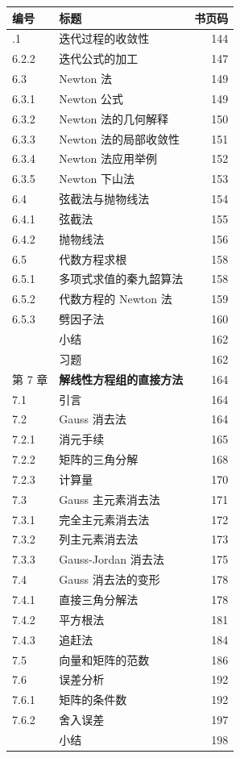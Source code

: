 {\def\LTcaptype{none} %
\begin{longtable}[]{@{}llr@{}}
\toprule\noalign{}
编号 & 标题 & 书页码 \\
\midrule\noalign{}
\endhead
\bottomrule\noalign{}
\endlastfoot
6.2.1 & 迭代过程的收敛性 & 144 \\
6.2.2 & 迭代公式的加工 & 147 \\
6.3 & Newton 法 & 149 \\
6.3.1 & Newton 公式 & 149 \\
6.3.2 & Newton 法的几何解释 & 150 \\
6.3.3 & Newton 法的局部收敛性 & 151 \\
6.3.4 & Newton 法应用举例 & 152 \\
6.3.5 & Newton 下山法 & 153 \\
6.4 & 弦截法与抛物线法 & 154 \\
6.4.1 & 弦截法 & 155 \\
6.4.2 & 抛物线法 & 156 \\
6.5 & 代数方程求根 & 158 \\
6.5.1 & 多项式求值的秦九韶算法 & 158 \\
6.5.2 & 代数方程的 Newton 法 & 159 \\
6.5.3 & 劈因子法 & 160 \\
& 小结 & 162 \\
& 习题 & 162 \\
第 7 章 & \textbf{解线性方程组的直接方法} & 164 \\
7.1 & 引言 & 164 \\
7.2 & Gauss 消去法 & 164 \\
7.2.1 & 消元手续 & 165 \\
7.2.2 & 矩阵的三角分解 & 168 \\
7.2.3 & 计算量 & 170 \\
7.3 & Gauss 主元素消去法 & 171 \\
7.3.1 & 完全主元素消去法 & 172 \\
7.3.2 & 列主元素消去法 & 173 \\
7.3.3 & Gauss-Jordan 消去法 & 175 \\
7.4 & Gauss 消去法的变形 & 178 \\
7.4.1 & 直接三角分解法 & 178 \\
7.4.2 & 平方根法 & 181 \\
7.4.3 & 追赶法 & 184 \\
7.5 & 向量和矩阵的范数 & 186 \\
7.6 & 误差分析 & 192 \\
7.6.1 & 矩阵的条件数 & 192 \\
7.6.2 & 舍入误差 & 197 \\
& 小结 & 198 \\
\end{longtable}
}

